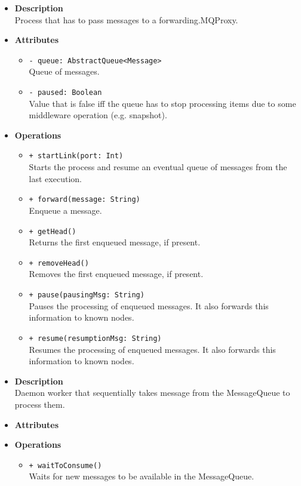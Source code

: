 \FloatBarrier
\begin{itemize}
  \item \textbf{Description} \\
    Process that has to pass messages to a forwarding.MQProxy.
  \item \textbf{Attributes}
    \begin{itemize}
      \item \texttt{- queue: AbstractQueue<Message>} \\
    Queue of messages.
      \item \texttt{- paused: Boolean} \\
    Value that is false iff the queue has to stop processing items due to
    some middleware operation (e.g. snapshot).
    \end{itemize}
  \item \textbf{Operations}
  \begin{itemize}
    \item \texttt{+ startLink(port: Int)} \\
    Starts the process and resume an eventual queue of messages from the
    last execution.
    \item \texttt{+ forward(message: String)} \\
    Enqueue a message.
    \item \texttt{+ getHead()} \\
    Returns the first enqueued message, if present.
    \item \texttt{+ removeHead()} \\
    Removes the first enqueued message, if present.
    \item \texttt{+ pause(pausingMsg: String)} \\
    Pauses the processing of enqueued messages. It also forwards this
    information to known nodes.
    \item \texttt{+ resume(resumptionMsg: String)} \\
    Resumes the processing of enqueued messages. It also forwards this
    information to known nodes.
  \end{itemize}
\end{itemize}

\FloatBarrier
\begin{itemize}
  \item \textbf{Description} \\
    Daemon worker that sequentially takes message from the MessageQueue to
    process them.
  \item \textbf{Attributes}
  \item \textbf{Operations}
  \begin{itemize}
    \item \texttt{+ waitToConsume()} \\
    Waits for new messages to be available in the MessageQueue.
  \end{itemize}
\end{itemize}

